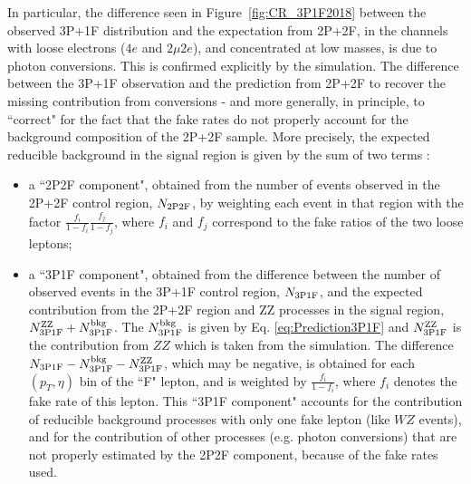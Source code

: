 In particular, the  difference seen in Figure~\ref{fig:CR_3P1F2018} between the observed
3P+1F distribution and the expectation from 2P+2F, in the
channels with loose electrons ($4e$ and $2\mu2e$), and concentrated at low
masses, is due to photon conversions. This is confirmed explicitly by the
simulation.
%
The difference between the 3P+1F observation and the prediction
from 2P+2F to recover the missing contribution from conversions - and more generally,
in principle, to ``correct" for the fact that the fake rates do not properly
account for the background composition of the 2P+2F sample.
More precisely, the expected reducible background in the signal region is given
by the sum of two terms :
%
\begin{itemize}
\item a ``2P2F component", obtained from the number of
  events observed in the 2P+2F control region, $N_{\rm 2P2F}$, by
  weighting each event in that region with the factor
  $\frac{f_{i}}{1-f_{i}} \frac{f_{j}}{1-f_{j}}$, where $f_{i}$ and
  $f_{j}$ correspond to the fake ratios of the two loose leptons;
\item a ``3P1F component", obtained from the
   difference between the number of observed events in the 3P+1F control
   region, $N_{\rm 3P1F}$, and the expected contribution from the 2P+2F
   region and ZZ processes in the signal region, $N^{\rm ZZ}_{\rm 3P1F} +
   N^{\rm bkg}_{\rm 3P1F}$. The $N^{\rm bkg}_{\rm 3P1F}$ is given by 
   Eq. \ref{eq:Prediction3P1F} and $N^{\rm ZZ}_{\rm 3P1F}$ is the
   contribution from $ZZ$ which is taken from the simulation. 
   The difference $N_{\rm 3P1F} -  N^{\rm bkg}_{\rm 3P1F} - N^{\rm ZZ}_{\rm 3P1F}$,
   which may be negative,
   is obtained for each $(p_T, \eta)$ bin of the ``F" lepton, and is weighted 
   by $\frac{f_i} {1 - f_i}$, where $f_i$ denotes the fake rate of
   this lepton.
   This ``3P1F component" accounts for the contribution of reducible background
   processes with only one fake lepton (like $WZ$ events), and for the contribution
   of other processes (e.g. photon conversions) that are not properly estimated
   by the 2P2F component, because of the fake rates used.
\end{itemize}

